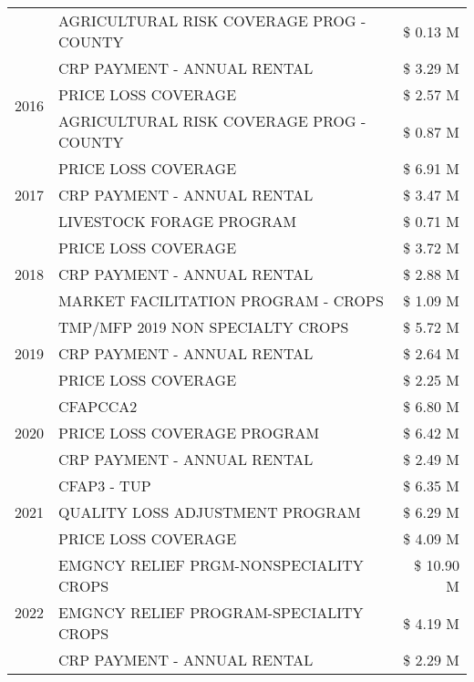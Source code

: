 \begin{tabular}{llr}
 & AGRICULTURAL RISK COVERAGE PROG - COUNTY & \$ 0.13 M \\
\cline{1-3}
\multirow[t]{3}{*}{2016} & CRP PAYMENT - ANNUAL RENTAL & \$ 3.29 M \\
 & PRICE LOSS COVERAGE & \$ 2.57 M \\
 & AGRICULTURAL RISK COVERAGE PROG - COUNTY & \$ 0.87 M \\
\cline{1-3}
\multirow[t]{3}{*}{2017} & PRICE LOSS COVERAGE & \$ 6.91 M \\
 & CRP PAYMENT - ANNUAL RENTAL & \$ 3.47 M \\
 & LIVESTOCK FORAGE PROGRAM & \$ 0.71 M \\
\cline{1-3}
\multirow[t]{3}{*}{2018} & PRICE LOSS COVERAGE & \$ 3.72 M \\
 & CRP PAYMENT - ANNUAL RENTAL & \$ 2.88 M \\
 & MARKET FACILITATION PROGRAM - CROPS & \$ 1.09 M \\
\cline{1-3}
\multirow[t]{3}{*}{2019} & TMP/MFP 2019 NON SPECIALTY CROPS & \$ 5.72 M \\
 & CRP PAYMENT - ANNUAL RENTAL & \$ 2.64 M \\
 & PRICE LOSS COVERAGE & \$ 2.25 M \\
\cline{1-3}
\multirow[t]{3}{*}{2020} & CFAPCCA2 & \$ 6.80 M \\
 & PRICE LOSS COVERAGE PROGRAM & \$ 6.42 M \\
 & CRP PAYMENT - ANNUAL RENTAL & \$ 2.49 M \\
\cline{1-3}
\multirow[t]{3}{*}{2021} & CFAP3 - TUP & \$ 6.35 M \\
 & QUALITY LOSS ADJUSTMENT PROGRAM & \$ 6.29 M \\
 & PRICE LOSS COVERAGE & \$ 4.09 M \\
\cline{1-3}
\multirow[t]{3}{*}{2022} & EMGNCY RELIEF PRGM-NONSPECIALITY CROPS & \$ 10.90 M \\
 & EMGNCY RELIEF PROGRAM-SPECIALITY CROPS & \$ 4.19 M \\
 & CRP PAYMENT - ANNUAL RENTAL & \$ 2.29 M \\
\cline{1-3}
\bottomrule
\end{tabular}
